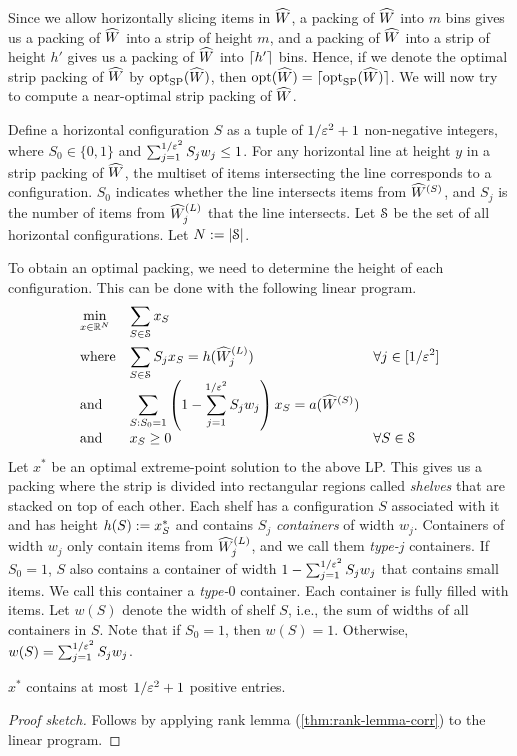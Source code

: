 Since we allow horizontally slicing items in $\widehat{W}$,
a packing of $\widehat{W}$ into $m$ bins gives us a
packing of $\widehat{W}$ into a strip of height $m$,
and a packing of $\widehat{W}$ into a strip of height $h'$ gives us a
packing of $\widehat{W}$ into $\lceil h' \rceil$ bins.
Hence, if we denote the optimal strip packing of $\widehat{W}$ by $\operatorname{opt}_{\mathrm{SP}}(\widehat{W})$,
then $\operatorname{opt}(\widehat{W}) = \lceil \operatorname{opt}_{\mathrm{SP}}(\widehat{W}) \rceil$.
We will now try to compute a near-optimal strip packing of $\widehat{W}$.

Define a horizontal configuration $S$ as a tuple of $1/\varepsilon^2+1$ non-negative integers,
where $S_0 \in \{0, 1\}$ and $\sum_{j=1}^{1/\varepsilon^2} S_jw_j \le 1$.
For any horizontal line at height $y$ in a strip packing of $\widehat{W}$,
the multiset of items intersecting the line corresponds to a configuration.
$S_0$ indicates whether the line intersects items from $\widehat{W}^{(S)}$,
and $S_j$ is the number of items from $\widehat{W}^{(L)}_j$ that the line intersects.
Let $\mathcal{S}$ be the set of all horizontal configurations. Let $N := |\mathcal{S}|$.

To obtain an optimal packing, we need to determine the height of each configuration.
This can be done with the following linear program.
\[ \optprog{\min_{x \in \mathbb{R}^N}}{\sum_{S \in \Scal} x_S}{
\\[1.5em] \textrm{where} & \sum_{S \in \Scal} S_jx_S = h(\WhatLarge_j)
    & \forall j \in [1/\eps^2]
\\ \textrm{and} & \sum_{S: S_0=1} \left(1 - \sum_{j=1}^{1/\eps^2}S_jw_j\right)x_S
    = a(\WhatSmall)
\\ \textrm{and} & x_S \ge 0 & \forall S \in \Scal
} \]
Let $x^*$ be an optimal extreme-point solution to the above LP.
This gives us a packing where the strip is divided into rectangular regions
called \emph{shelves} that are stacked on top of each other.
Each shelf has a configuration $S$ associated with it
and has height $h(S) := x^*_S$ and contains $S_j$ \emph{containers} of width $w_j$.
Containers of width $w_j$ only contain items from $\widehat{W}^{(L)}_j$,
and we call them \emph{type-$j$} containers.
If $S_0 = 1$, $S$ also contains a container of width $1 - \sum_{j=1}^{1/\varepsilon^2} S_jw_j$
that contains small items. We call this container a \emph{type-$0$} container.
Each container is fully filled with items.
Let $w(S)$ denote the width of shelf $S$, i.e., the sum of widths of all containers in $S$.
Note that if $S_0 = 1$, then $w(S) = 1$. Otherwise, $w(S) = \sum_{j=1}^{1/\varepsilon^2} S_jw_j$.

\begin{lemma}
\label{thm:nonneg-entries}
$x^*$ contains at most $1/\varepsilon^2+1$ positive entries.
\end{lemma}
\begin{proof}[Proof sketch]
Follows by applying rank lemma (\cref{thm:rank-lemma-corr}) to the linear program.
\end{proof}

